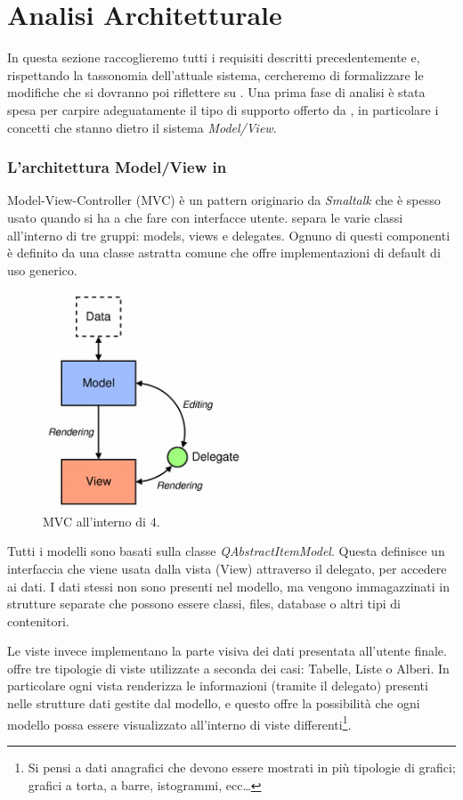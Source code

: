 \section{Analisi Architetturale}
In questa sezione raccoglieremo tutti i requisiti descritti precedentemente e, rispettando la tassonomia dell'attuale sistema, cercheremo di formalizzare le modifiche che si dovranno poi riflettere su \visualnetkit{}. Una prima fase di analisi è stata spesa per carpire adeguatamente il tipo di supporto offerto da \qt{}, in particolare i concetti che stanno dietro il sistema \emph{Model/View}.

\subsubsection*{L'architettura Model/View in \qt{}}
Model-View-Controller (MVC) è un pattern originario da \emph{Smaltalk} che è spesso usato quando si ha a che fare con interfacce utente. \qt{} separa le varie classi all'interno di tre gruppi: models, views e delegates. Ognuno di questi componenti è definito da una classe astratta comune che offre implementazioni di default di uso generico.

\begin{figure}[!htb]
	\centering
	\includegraphics[width=6cm]{images/modelview-overview.png}
	\caption{MVC all'interno di \qt{}$4$.}
	\label{figura:qt_mvc}
\end{figure}

Tutti i modelli sono basati sulla classe \emph{QAbstractItemModel}. Questa definisce un interfaccia che viene usata dalla vista (View) attraverso il delegato, per accedere ai dati. I dati stessi non sono presenti nel modello, ma vengono immagazzinati in strutture separate che possono essere classi, files, database o altri tipi di contenitori.

Le viste invece implementano la parte visiva dei dati presentata all'utente finale. \qt{} offre tre tipologie di viste utilizzate a seconda dei casi: Tabelle, Liste o Alberi. In particolare ogni vista renderizza le informazioni (tramite il delegato) presenti nelle strutture dati gestite dal modello, e questo offre la possibilità che ogni modello possa essere visualizzato all'interno di viste differenti\footnote{Si pensi a dati anagrafici che devono essere mostrati in più tipologie di grafici; grafici a torta, a barre, istogrammi, ecc\ldots}.

